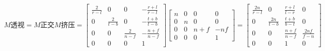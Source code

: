 $$
M透视 = M正交M挤压 =
\begin{bmatrix}
  \frac{2}{r-l} & 0 & 0 & -\frac{r+l}{r-l} \\
  0 & \frac{2}{t-b} & 0 & -\frac{t+b}{t-b} \\
  0 & 0 & \frac{2}{n-f} & -\frac{n+f}{n-f} \\
  0 & 0 & 0 & 1
\end{bmatrix}
\begin{bmatrix}
  n & 0 & 0 & 0 \\
  0 & n & 0 & 0 \\
  0 & 0 & n + f & -nf \\
  0 & 0 & 0 & 1
\end{bmatrix}
=
\begin{bmatrix}
  \frac{2n}{r-l} & 0 & \frac{r+l}{l-r} & 0 \\
  0 & \frac{2n}{t-b} & \frac{t+b}{b-t} & 0 \\
  0 & 0 & \frac{n + f}{n-f} & \frac{2nf}{f-n} \\
  0 & 0 & 1 & 0
\end{bmatrix}
$$